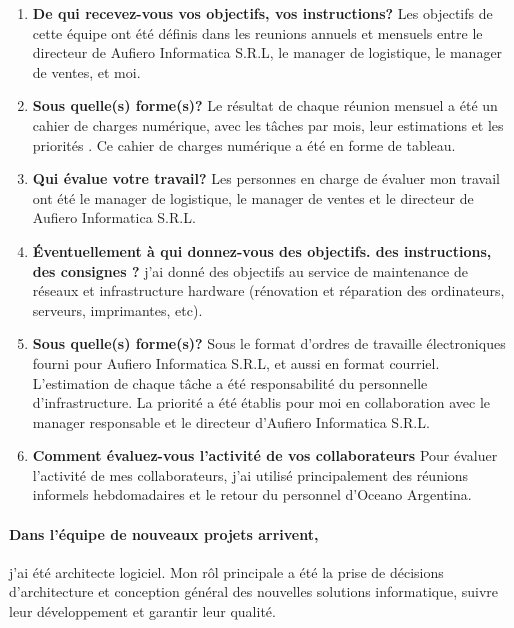 \documentclass{resume} %
\begin{document}
		\begin{enumerate}
		\item \textbf{De qui recevez-vous vos objectifs, vos instructions?}
			Les objectifs de cette équipe ont été définis dans les reunions annuels et mensuels entre le directeur de Aufiero Informatica S.R.L, le manager de logistique, le manager de ventes, et moi.
		\item \textbf{Sous quelle(s) forme(s)?}
			Le résultat de chaque réunion mensuel a été un cahier de charges numérique, avec les tâches par mois, leur estimations et les priorités . Ce cahier de charges numérique  a été en forme de tableau.
		\item \textbf{Qui évalue votre travail?}
			Les personnes en charge de évaluer mon travail ont été  le manager de logistique, le manager de ventes et le directeur de Aufiero Informatica S.R.L. 
		\item  \textbf{Éventuellement à qui donnez-vous des objectifs. des instructions, des consignes ?}
			j'ai donné des objectifs au service de maintenance de réseaux et infrastructure hardware (rénovation et réparation des ordinateurs, serveurs, imprimantes, etc).
		\item \textbf{Sous quelle(s) forme(s)?}
			Sous le format d'ordres de travaille électroniques fourni pour Aufiero Informatica S.R.L, et aussi en format courriel. L'estimation de chaque tâche a été responsabilité du personnelle d'infrastructure. 
			La priorité a été établis pour moi en collaboration avec le manager responsable et le directeur d'Aufiero Informatica S.R.L.  
		\item \textbf{Comment évaluez-vous l'activité de vos collaborateurs}
			Pour évaluer l'activité de mes collaborateurs, j'ai utilisé principalement des réunions informels hebdomadaires et le retour du personnel d'Oceano Argentina. 
		\end{enumerate}
		
		\paragraph{Dans l'équipe de nouveaux projets arrivent,} j'ai été architecte logiciel. Mon rôl principale a été la  prise de décisions d'architecture et conception général des nouvelles solutions informatique, suivre leur développement et garantir leur qualité. 
		
\end{document}
